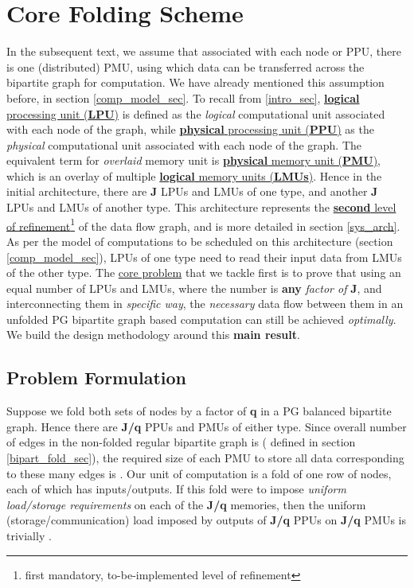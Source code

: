 \documentclass[12pt]{article}
\begin{document}
\section{Core Folding Scheme}
\label{outline_sec}
In the subsequent text, we assume that associated with each node or
PPU, there is one (distributed) PMU,
using which data can be transferred across the bipartite graph for computation. We have
already mentioned this assumption before, in section \ref{comp_model_sec}.
To recall from \ref{intro_sec}, \uline{\textbf{logical}
processing unit (\textbf{LPU})} is defined as the \textit{logical}
computational unit associated with each node of the graph, while
\uline{\textbf{physical} processing unit (\textbf{PPU})} as the
\textit{physical} computational unit associated with each node of the graph.
The equivalent term for \textit{overlaid} memory unit is
\uline{\textbf{physical} memory unit (\textbf{PMU})}, which is an overlay of
multiple \uline{\textbf{logical} memory units (\textbf{LMUs})}.
Hence in the initial architecture, there are \textbf{J}
LPUs and LMUs of one type, and
another \textbf{J} LPUs and LMUs of another type.
This architecture represents the \uline{\textbf{second} level of
refinement}\footnote{first mandatory, to-be-implemented level of
refinement} of the data
flow graph, and is more detailed in section \ref{sys_arch}. As per
the model of computations to be scheduled on this architecture (section
\ref{comp_model_sec}), LPUs of one type need to read their input data from LMUs of
the other type. The
\underline{core problem} that we tackle first is to prove that using an
equal number of LPUs and LMUs, where the number is
\textbf{any} \textit{factor of} \textbf{J}, and interconnecting them in
\textit{specific way}, the
\textit{necessary} data flow between them in an unfolded PG bipartite graph based
computation can still be achieved \textit{optimally}. We build the design methodology around
this \textbf{main result}.

\subsection{Problem Formulation}
\label{prob_form_sec}

Suppose we fold both sets of nodes by a factor of {\normalsize \textbf{q}} in a PG
balanced bipartite graph.  Hence there are \textbf{J/q} PPUs
and PMUs
of either type. Since overall number of edges in the
non-folded regular bipartite graph is (
defined in section \ref{bipart_fold_sec}), the required size
of each PMU to store all data
corresponding to these
many edges is . Our unit of computation is a
fold of one row of nodes, each of which has 
inputs/outputs. If this fold were to impose \textit{uniform
load/storage requirements} on each of the \textbf{J/q} memories, then
the uniform (storage/communication) load imposed by outputs of \textbf{J/q}
PPUs on \textbf{J/q} PMUs is trivially .
\end{document}
